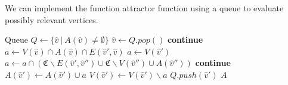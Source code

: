 We can implement the function attractor function using a queue to evaluate possibly relevant vertices.
\begin{algorithm}[h]
	\caption{$\textsc{$\alpha$-FAttr}(A : \hat{V} \rightarrow 2^\mathfrak{C})$}
	\begin{algorithmic}[1]
		\State Queue $Q \gets \{\hat{v}\ |\ A(\hat{v}) \neq \emptyset  \}$
		\State $\hat{v} \gets Q.pop()$
			 \State \textbf{continue} \EndIf
				\State $a \gets V(\hat{v}) \cap A(\hat{v}) \cap E(\hat{v}',\hat{v})$
			\Else
				\State $a \gets V(\hat{v}')$
					\State $a \gets a \cap (\mathfrak{C}\backslash E(\hat{v}',\hat{v}'') \cup \mathfrak{C} \backslash V(\hat{v}'') \cup A(\hat{v}''))$
				\EndFor
			\EndIf
			 \State \textbf{continue} \EndIf
			\State $A(\hat{v}') \gets A(\hat{v}') \cup a$
			\State $V(\hat{v}') \gets V(\hat{v}') \backslash a$
			\State $Q.push(\hat{v}')$
		\EndFor
		\EndWhile
		\State \Return $A$
	\end{algorithmic}
\end{algorithm}